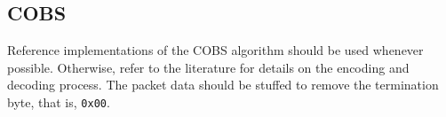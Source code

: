 \documentclass[a4paper,11pt,english]{article}
\begin{document}
\subsection{COBS}
Reference implementations of the COBS algorithm should be used whenever possible. Otherwise, refer to the literature for details on the encoding and decoding process. The packet data should be stuffed to remove the termination byte, that is, \texttt{0x00}.
\end{document}
